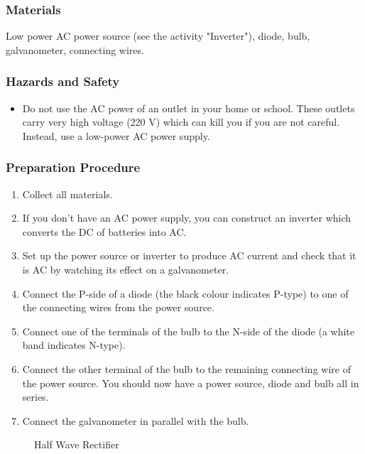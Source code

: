 \subsubsection*{Materials}
Low power AC power source (see the activity "Inverter"), diode, bulb, galvanometer, connecting wires.

\subsubsection*{Hazards and Safety}
\begin{itemize}
\item{Do not use the AC power of an outlet in your home or school.  These outlets carry very high voltage (220 V) which can kill you if you are not careful.  Instead, use a low-power AC power supply.}
\end{itemize}

\subsubsection*{Preparation Procedure}
\begin{enumerate}
\item{Collect all materials.}
\item{If you don't have an AC power supply, you can construct an inverter which converts the DC of batteries into AC.}
\item{Set up the power source or inverter to produce AC current and check that it is AC by watching its effect on a galvanometer.}
\item{Connect the P-side of a diode (the black colour indicates P-type) to one of the connecting wires from the power source.}
\item{Connect one of the terminals of the bulb to the N-side of the diode (a white band indicates N-type).}
\item{Connect the other terminal of the bulb to the remaining connecting wire of the power source.  You should now have a power source, diode and bulb all in series.}
\item{Connect the galvanometer in parallel with the bulb.}
\end{enumerate}

\begin{figure}
\begin{center}
\def\svgwidth{150pt}

\caption{Half Wave Rectifier}
\label{fig:half-wave-rectifier}
\end{center}
\end{figure}

